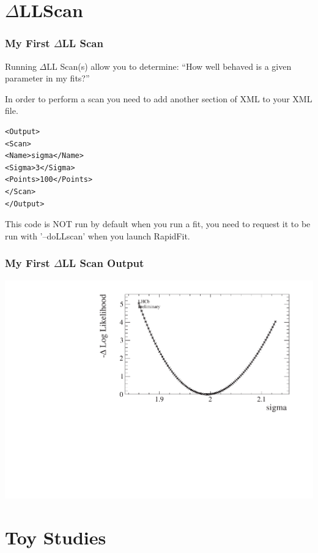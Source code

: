 \documentclass{beamer}
\begin{document}
\section{$\Delta$LLScan}
\begin{frame}[fragile]
\frametitle{My First $\Delta$LL Scan}

Running $\Delta$LL Scan(s) allow you to determine:\newline
``How well behaved is a given parameter in my fits?''\newline\newline

In order to perform a scan you need to add another section of XML to your XML file.
\tiny
\begin{lstlisting}[tabsize=8]
<Output>
<Scan>
<Name>sigma</Name>
<Sigma>3</Sigma>
<Points>100</Points>
</Scan>
</Output>
\end{lstlisting}
\normalsize
This code is NOT run by default when you run a fit, you need to request it to be run with '--doLLscan' when you launch RapidFit.

\end{frame}

\begin{frame}
\frametitle{My First $\Delta$LL Scan Output}
\includegraphics[width=\textwidth]{./RapidLL_sigma_conf.pdf}
\end{frame}

\section{Toy Studies}
\end{document}
